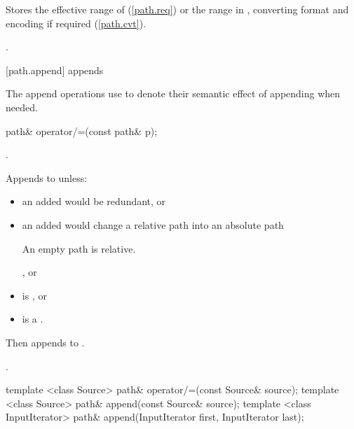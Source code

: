 \begin{itemdescr}
\pnum
\effects Stores the effective range of  (\ref{path.req})
or the range  in ,
converting format and encoding if required (\ref{path.cvt}).

\pnum
\returns {}.
\end{itemdescr}

[path.append]{ appends}

\pnum
The append operations use  to denote their semantic effect of appending
 when needed.

%
\begin{itemdecl}
path& operator/=(const path& p);
\end{itemdecl}

\begin{itemdescr}
\pnum
\requires {}.

\pnum
\effects Appends  to  unless:
\begin{itemize}
\item an added 
    would be redundant, or
\item an added  would change a relative path into an absolute path
    \begin{note} An empty path is relative.\end{note}, or
\item {} is , or
\item {} is a .
\end{itemize}
Then appends  to .

\pnum
\returns {}.
\end{itemdescr}

%
%
\begin{itemdecl}
template <class Source>
  path& operator/=(const Source& source);
template <class Source>
  path& append(const Source& source);
template <class InputIterator>
  path& append(InputIterator first, InputIterator last);
\end{itemdecl}

